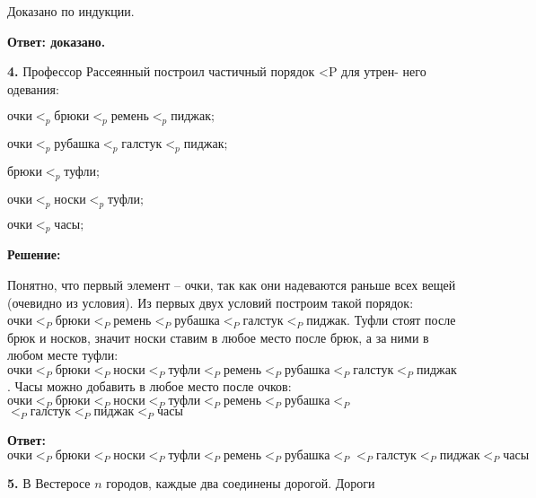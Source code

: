 \documentclass[a4paper,12pt]{article} %
\begin{document}
Доказано по индукции.


\begin{flushright}
\begin{large}
\textbf {Ответ: доказано.}
\end{large}
\end{flushright}

{\bf 4.} Профессор Рассеянный построил частичный порядок <P для утрен-
него одевания:

\begin{flushleft}

$ \textbf{очки} <_p \textbf{брюки} <_p \textbf{ремень} <_p \textbf{пиджак};$

$ \textbf{очки} <_p \textbf{рубашка} <_p \textbf{галстук} <_p \textbf{пиджак}; $

$ \textbf{брюки} <_p \textbf{туфли}; $

$ \textbf{очки} <_p \textbf{носки} <_p \textbf{туфли};  $

$ \textbf{очки} <_p \textbf{часы}; $

\end{flushleft}

\begin{center}
\bfseries
{\Large Решение: }
\end{center}

Понятно, что первый элемент -- очки, так как они надеваются раньше всех вещей (очевидно из условия). Из первых двух условий построим такой порядок:
$\text{очки} <_P \text{брюки} <_P \text{ремень} <_P \text{рубашка} <_P \text{галстук}<_P \text{пиджак}$. Туфли стоят после брюк и носков, значит носки ставим в любое место после брюк, а за ними в любом месте туфли: $\text{очки} <_P \text{брюки}<_P \text{носки} <_P \text{туфли}<_P \text{ремень} <_P \text{рубашка} <_P \text{галстук}<_P \text{пиджак}$. Часы можно добавить в любое место после очков: $\text{очки} <_P \text{брюки} <_P \text{носки} <_P \text{туфли} <_P \text{ремень} <_P \text{рубашка} <_P$
$ <_P \text{галстук} <_P \text{пиджак} <_P \text{часы}$

\begin{flushright}
\begin{large}
\textbf {Ответ: $\text{очки} <_P \text{брюки} <_P \text{носки} <_P \text{туфли} <_P \text{ремень} <_P \text{рубашка} <_P <_P \text{галстук} <_P \text{пиджак} <_P \text{часы}$}
\end{large}
\end{flushright}

{\bf 5.} В Вестеросе $n$ городов, каждые два соединены дорогой. Дороги
\end{document}
